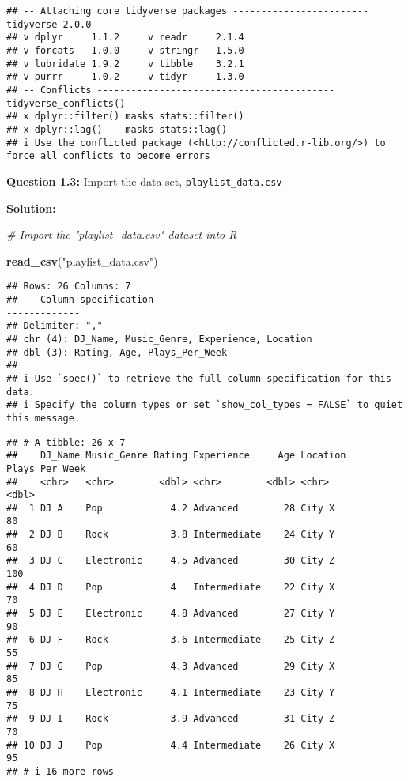 \documentclass[
]{article}
\newenvironment{Shaded}{\begin{snugshade}}{\end{snugshade}}
\newcommand{\CommentTok}[1]{\textcolor[rgb]{0.56,0.35,0.01}{\textit{#1}}}
\newcommand{\FunctionTok}[1]{\textcolor[rgb]{0.13,0.29,0.53}{\textbf{#1}}}
\newcommand{\NormalTok}[1]{#1}
\newcommand{\StringTok}[1]{\textcolor[rgb]{0.31,0.60,0.02}{#1}}
\begin{document}
\begin{verbatim}
## -- Attaching core tidyverse packages ------------------------ tidyverse 2.0.0 --
## v dplyr     1.1.2     v readr     2.1.4
## v forcats   1.0.0     v stringr   1.5.0
## v lubridate 1.9.2     v tibble    3.2.1
## v purrr     1.0.2     v tidyr     1.3.0
## -- Conflicts ------------------------------------------ tidyverse_conflicts() --
## x dplyr::filter() masks stats::filter()
## x dplyr::lag()    masks stats::lag()
## i Use the conflicted package (<http://conflicted.r-lib.org/>) to force all conflicts to become errors
\end{verbatim}

\textbf{Question 1.3:} Import the data-set, \texttt{playlist\_data.csv}

\textbf{Solution:}

\begin{Shaded}
\begin{Highlighting}[]
\CommentTok{\# Import the "playlist\_data.csv" dataset into R }

\FunctionTok{read\_csv}\NormalTok{(}\StringTok{"playlist\_data.csv"}\NormalTok{)}
\end{Highlighting}
\end{Shaded}

\begin{verbatim}
## Rows: 26 Columns: 7
## -- Column specification --------------------------------------------------------
## Delimiter: ","
## chr (4): DJ_Name, Music_Genre, Experience, Location
## dbl (3): Rating, Age, Plays_Per_Week
## 
## i Use `spec()` to retrieve the full column specification for this data.
## i Specify the column types or set `show_col_types = FALSE` to quiet this message.
\end{verbatim}

\begin{verbatim}
## # A tibble: 26 x 7
##    DJ_Name Music_Genre Rating Experience     Age Location Plays_Per_Week
##    <chr>   <chr>        <dbl> <chr>        <dbl> <chr>             <dbl>
##  1 DJ A    Pop            4.2 Advanced        28 City X               80
##  2 DJ B    Rock           3.8 Intermediate    24 City Y               60
##  3 DJ C    Electronic     4.5 Advanced        30 City Z              100
##  4 DJ D    Pop            4   Intermediate    22 City X               70
##  5 DJ E    Electronic     4.8 Advanced        27 City Y               90
##  6 DJ F    Rock           3.6 Intermediate    25 City Z               55
##  7 DJ G    Pop            4.3 Advanced        29 City X               85
##  8 DJ H    Electronic     4.1 Intermediate    23 City Y               75
##  9 DJ I    Rock           3.9 Advanced        31 City Z               70
## 10 DJ J    Pop            4.4 Intermediate    26 City X               95
## # i 16 more rows
\end{verbatim}
\end{document}
